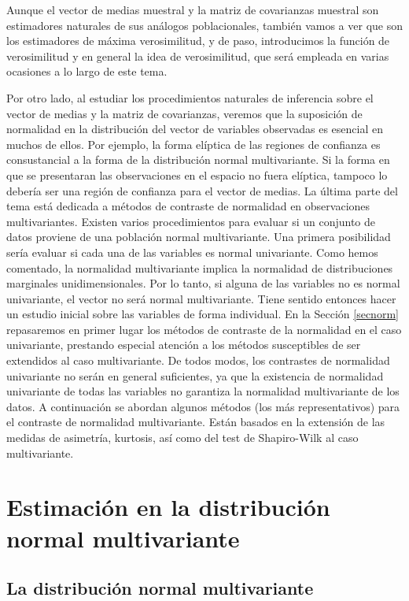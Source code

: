 \documentclass[
  a4paper,
  oneside]{scrbook}
\theoremstyle{definition}
\theoremstyle{definition}
\theoremstyle{definition}
\theoremstyle{definition}
\theoremstyle{remark}
\begin{document}
Aunque el vector de medias muestral y la matriz de covarianzas muestral
son estimadores naturales de sus análogos poblacionales, también vamos a
ver que son los estimadores de máxima verosimilitud, y de paso,
introducimos la función de verosimilitud y en general la idea de
verosimilitud, que será empleada en varias ocasiones a lo largo de este
tema.

Por otro lado, al estudiar los procedimientos naturales de inferencia
sobre el vector de medias y la matriz de covarianzas, veremos que la
suposición de normalidad en la distribución del vector de variables
observadas es esencial en muchos de ellos. Por ejemplo, la forma
elíptica de las regiones de confianza es consustancial a la forma de la
distribución normal multivariante. Si la forma en que se presentaran las
observaciones en el espacio no fuera elíptica, tampoco lo debería ser
una región de confianza para el vector de medias. La última parte del
tema está dedicada a métodos de contraste de normalidad en observaciones
multivariantes. Existen varios procedimientos para evaluar si un
conjunto de datos proviene de una población normal multivariante. Una
primera posibilidad sería evaluar si cada una de las variables es normal
univariante. Como hemos comentado, la normalidad multivariante implica
la normalidad de distribuciones marginales unidimensionales. Por lo
tanto, si alguna de las variables no es normal univariante, el vector no
será normal multivariante. Tiene sentido entonces hacer un estudio
inicial sobre las variables de forma individual. En la Sección
\ref{secnorm} repasaremos en primer lugar los métodos de contraste de la normalidad en el caso
univariante, prestando especial atención a los métodos susceptibles de
ser extendidos al caso multivariante. De todos modos, los contrastes de
normalidad univariante no serán en general suficientes, ya que la
existencia de normalidad univariante de todas las variables no garantiza
la normalidad multivariante de los datos. A continuación se
abordan algunos métodos (los más representativos) para el contraste de
normalidad multivariante. Están basados en la extensión de las medidas
de asimetría, kurtosis, así como del test de Shapiro-Wilk al caso
multivariante.

\section{Estimación en la distribución normal multivariante}\label{estimacion-en-la-distribucion-normal-multivariante}

\subsection{La distribución normal multivariante}\label{la-distribucion-normal-multivariante}
\end{document}
